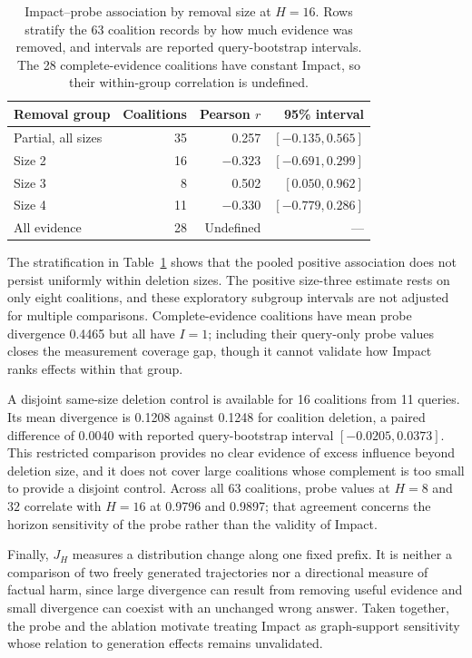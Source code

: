 \documentclass[sigconf]{aamas}
\begin{document}
\begin{table}[t]
\caption{Impact--probe association by removal size at $H=16$. Rows stratify the 63 coalition records by how much evidence was removed, and intervals are reported query-bootstrap intervals. The 28 complete-evidence coalitions have constant Impact, so their within-group correlation is undefined.}
\label{tab:probe}
\centering
\begin{tabular}{lrrr}
\toprule
Removal group & Coalitions & Pearson $r$ & 95\% interval\\
\midrule
Partial, all sizes & 35 & 0.257 & $[-0.135,0.565]$\\
Size 2 & 16 & $-0.323$ & $[-0.691,0.299]$\\
Size 3 & 8 & 0.502 & $[0.050,0.962]$\\
Size 4 & 11 & $-0.330$ & $[-0.779,0.286]$\\
All evidence & 28 & Undefined & ---\\
\bottomrule
\end{tabular}
\end{table}

The stratification in Table~\ref{tab:probe} shows that the pooled positive association does not persist uniformly within deletion sizes. The positive size-three estimate rests on only eight coalitions, and these exploratory subgroup intervals are not adjusted for multiple comparisons. Complete-evidence coalitions have mean probe divergence 0.4465 but all have $I=1$; including their query-only probe values closes the measurement coverage gap, though it cannot validate how Impact ranks effects within that group.

A disjoint same-size deletion control is available for 16 coalitions from 11 queries. Its mean divergence is 0.1208 against 0.1248 for coalition deletion, a paired difference of 0.0040 with reported query-bootstrap interval $[-0.0205,0.0373]$. This restricted comparison provides no clear evidence of excess influence beyond deletion size, and it does not cover large coalitions whose complement is too small to provide a disjoint control. Across all 63 coalitions, probe values at $H=8$ and $32$ correlate with $H=16$ at 0.9796 and 0.9897; that agreement concerns the horizon sensitivity of the probe rather than the validity of Impact.

Finally, $J_H$ measures a distribution change along one fixed prefix. It is neither a comparison of two freely generated trajectories nor a directional measure of factual harm, since large divergence can result from removing useful evidence and small divergence can coexist with an unchanged wrong answer. Taken together, the probe and the ablation motivate treating Impact as graph-support sensitivity whose relation to generation effects remains unvalidated.
\end{document}
